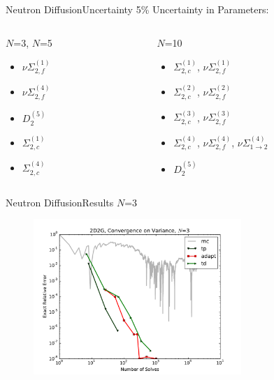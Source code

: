 \documentclass{beamer}
\begin{document}
\begin{frame}{Neutron Diffusion}{Uncertainty}\vspace{-20pt}
  5\% Uncertainty in Parameters:
  \begin{columns}
  \begin{column}{0.5\textwidth}
    $N$=3, $N$=5
    \begin{itemize}
      \item $\nu\Sigma^{(1)}_{2,f}$
      \item $\nu\Sigma^{(4)}_{2,f}$
      \item $D^{(5)}_2$ \vspace{20pt}
      \item $\Sigma^{(1)}_{2,c}$
      \item $\Sigma^{(4)}_{2,c}$
    \end{itemize}
  \end{column}
  \begin{column}{0.5\textwidth}
    $N$=10
    \begin{itemize}
      \item $\Sigma^{(1)}_{2,c}$, $\nu\Sigma^{(1)}_{2,f}$
      \item $\Sigma^{(2)}_{2,c}$, $\nu\Sigma^{(2)}_{2,f}$
      \item $\Sigma^{(3)}_{2,c}$, $\nu\Sigma^{(3)}_{2,f}$
      \item $\Sigma^{(4)}_{2,c}$, $\nu\Sigma^{(4)}_{2,f}$, $\nu\Sigma^{(4)}_{1\to2}$
      \item $D^{(5)}_2$ \vspace{20pt}
    \end{itemize}
  \end{column}
  \end{columns}
\end{frame}

\begin{frame}{Neutron Diffusion}{Results}%
  $N$=3
  \begin{figure}[h!]
    \centering
    \includegraphics[width=0.7\textwidth]{../../graphics/2D2G_varconv_3}
  \end{figure}
\end{frame}
\end{document}
